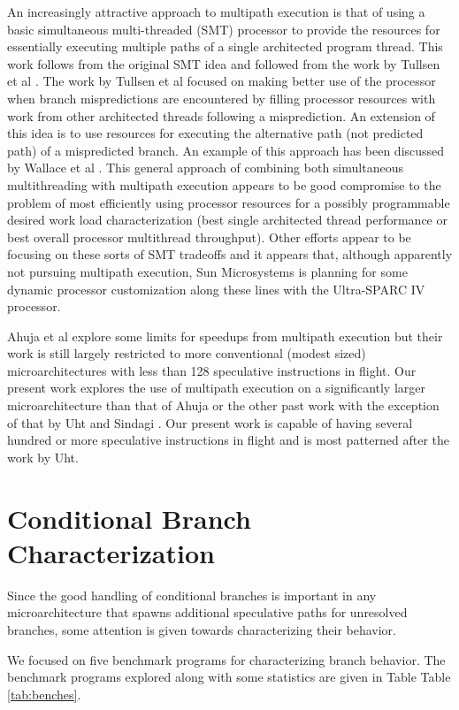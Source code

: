 \documentclass[10pt,dvips]{article}
\begin{document}
An increasingly attractive approach to multipath execution is that
of using a basic simultaneous multi-threaded (SMT) processor
to provide the resources for essentially executing multiple paths
of a single architected program thread.  This work follows from
the original SMT idea and followed from the work by
Tullsen et al \cite{Tullsen96}.  The work by Tullsen et al focused
on making better use of the processor when
branch mispredictions are encountered by filling processor resources with
work from other architected threads following a misprediction.
An extension of this idea is to use resources for executing
the alternative path (not predicted path) of a mispredicted branch.
An example of this approach has been discussed by 
Wallace et al \cite{Wallace98}.  This general approach of combining
both simultaneous multithreading with multipath execution appears
to be good compromise to the problem of most efficiently using
processor resources for a possibly programmable desired work load
characterization (best single architected thread performance or
best overall processor multithread throughput).  Other efforts
appear to be focusing on these sorts of SMT tradeoffs and
it appears that, although apparently not pursuing multipath execution, 
Sun Microsystems
is planning for some dynamic processor customization along these lines 
with the Ultra-SPARC IV processor.

Ahuja et al \cite{Ahuja98} explore some limits for speedups from
multipath execution but their work is still largely restricted to more
conventional (modest sized) microarchitectures with less than 128
speculative instructions in flight.  Our present work explores the use
of multipath execution on a significantly larger microarchitecture than
that of Ahuja or the other past work with the exception of that by
Uht and 
Sindagi \cite{Uht95}.
Our present work is capable of having several hundred or more
speculative instructions in flight and is most patterned after the
work by Uht.
%
\section{Conditional Branch Characterization}
%
Since the good handling of conditional branches is important
in any microarchitecture that spawns additional speculative
paths for unresolved branches, some attention is given
towards characterizing their behavior.  

We focused
on five benchmark programs for characterizing branch behavior.
The benchmark programs explored along with some statistics 
are given in Table
Table \ref{tab:benches}.
\end{document}
